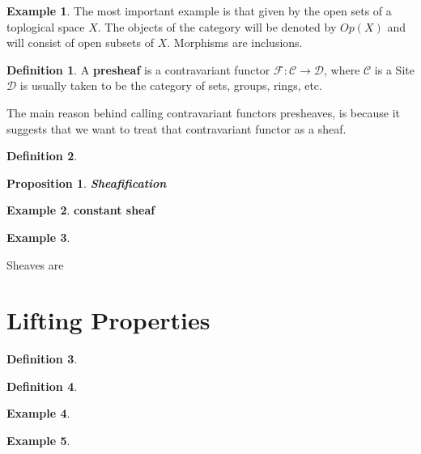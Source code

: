 \documentclass[12pt]{article}
\theoremstyle{theorem}
\newtheorem{proposition}[theorem]{Proposition}
\theoremstyle{definition}
\newtheorem{definition}{Definition} [section]
\newtheorem{example}{Example}
\theoremstyle{remark}
\theoremstyle{gremark}
\theoremstyle{discussion}
\theoremstyle{notation}
\begin{document}
		\begin{example}
		The most important example is that given by the open sets of a toplogical space $X$. The objects of the category will be denoted by $Op(X)$ and will consist of open subsets of $X$. Morphisms are inclusions.
		\end{example}
	
	\begin{definition}
		A \textbf{presheaf} is a contravariant functor $\mathcal{F}:\mathcal{C}\to \mathcal{D}$, where $\mathcal{C}$ is a Site $\mathcal{D}$ is usually taken to be the category of sets, groups, rings, etc.
	\end{definition}

	The main reason behind calling contravariant functors presheaves, is because it suggests that we want to treat that contravariant functor as a sheaf. 

	\begin{definition}
		
	\end{definition}

	\begin{proposition}
		\textbf{Sheafification}
	\end{proposition}

	\begin{example}
		\textbf{constant sheaf}
	\end{example}

	\begin{example}
		
	\end{example}

	Sheaves are 
	
	
	\section{Lifting Properties}
	
	\begin{definition}
		
	\end{definition}

	\begin{definition}
		
	\end{definition}

	\begin{example}
		
	\end{example}

	\begin{example}
		
	\end{example}
\end{document}
